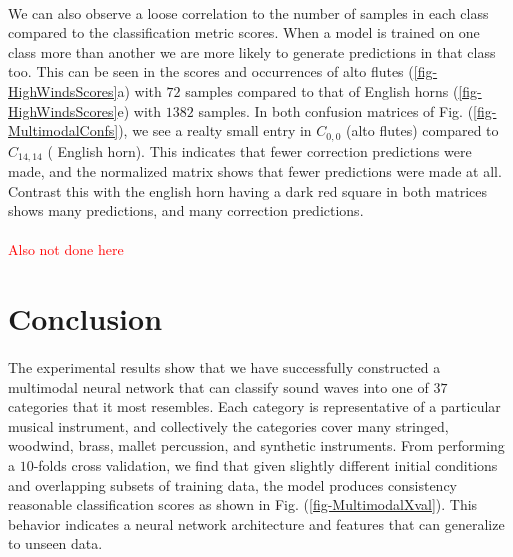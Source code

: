 \documentclass[12pt,letterpaper]{article}
\begin{document}
\paragraph*{}We can also observe a loose correlation to the number of samples in each class compared to the classification metric scores. When a model is trained on one class more than another we are more likely to generate predictions in that class too. This can be seen in the scores and occurrences of alto flutes (\ref{fig-HighWindsScores}a) with $72$ samples compared to that of English horns (\ref{fig-HighWindsScores}e) with $1382$ samples. In both confusion matrices of Fig. (\ref{fig-MultimodalConfs}), we see a realty small entry in $C_{0,0}$ (alto flutes) compared to $C_{14,14}$ ( English horn). This indicates that fewer correction predictions were made, and the normalized matrix shows that fewer predictions were made at all. Contrast this with the english horn having a dark red square in both matrices shows many predictions, and many correction predictions. 


\paragraph*{}
\textcolor{red}{Also not done here}



\newpage
\section{Conclusion}
\label{sec-Conclusion}

\paragraph*{}The experimental results show that we have successfully constructed a multimodal neural network that can classify sound waves into one of $37$ categories that it most resembles. Each category is representative of a particular musical instrument, and collectively the categories cover many stringed, woodwind, brass, mallet percussion, and synthetic instruments. From performing a $10$-folds cross validation, we find that given slightly different initial conditions and overlapping subsets of training data, the model produces consistency reasonable classification scores as shown in Fig. (\ref{fig-MultimodalXval}). This behavior indicates a neural network architecture and features that can generalize to unseen data.
\end{document}
